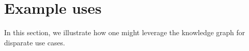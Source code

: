 \section{Example uses}
In this section, we illustrate how one might leverage the knowledge graph for disparate use cases.
